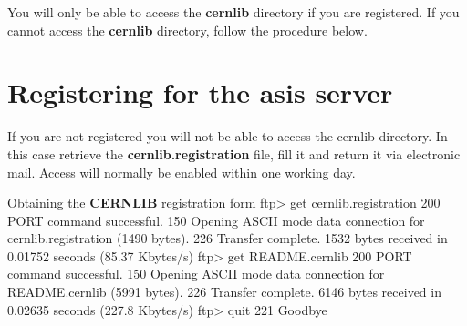 You will only be able to access the {\bf cernlib} directory if you
are registered. If you cannot access the {\bf cernlib} directory,
follow the procedure below.

\section{Registering for the asis server}
If you are not registered you will not be able to access the
cernlib directory. In this case retrieve the {\bf cernlib.registration} file,
fill it and return it via electronic mail. Access will normally be enabled within
one working day.

\begin{XMPt}{Obtaining the {\bf CERNLIB} registration form}
ftp> get cernlib.registration
200 PORT command successful.
150 Opening ASCII mode data connection for cernlib.registration (1490 bytes).
226 Transfer complete.
1532 bytes received in 0.01752 seconds (85.37 Kbytes/s)
ftp> get README.cernlib
200 PORT command successful.
150 Opening ASCII mode data connection for README.cernlib (5991 bytes).
226 Transfer complete.
6146 bytes received in 0.02635 seconds (227.8 Kbytes/s)
ftp> quit
221 Goodbye
\end{XMPt}

